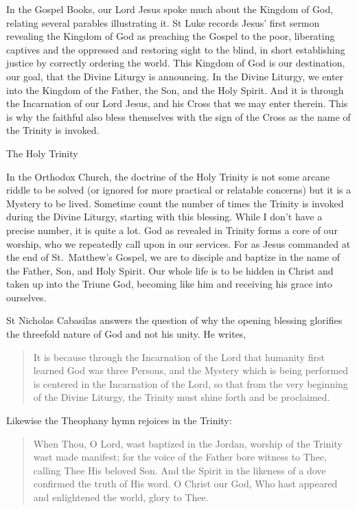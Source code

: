 \documentclass[
]{article}
\begin{document}
In the Gospel Books, our Lord Jesus spoke much about the Kingdom of God,
relating several parables illustrating it. St Luke records Jesus' first
sermon revealing the Kingdom of God as preaching the Gospel to the poor,
liberating captives and the oppressed and restoring sight to the blind,
in short establishing justice by correctly ordering the world. This
Kingdom of God is our destination, our goal, that the Divine Liturgy is
announcing. In the Divine Liturgy, we enter into the Kingdom of the
Father, the Son, and the Holy Spirit. And it is through the Incarnation
of our Lord Jesus, and his Cross that we may enter therein. This is why
the faithful also bless themselves with the sign of the Cross as the
name of the Trinity is invoked.

The Holy Trinity

In the Orthodox Church, the doctrine of the Holy Trinity is not some
arcane riddle to be solved (or ignored for more practical or relatable
concerns) but it is a Mystery to be lived. Sometime count the number of
times the Trinity is invoked during the Divine Liturgy, starting with
this blessing. While I don't have a precise number, it is quite a lot.
God as revealed in Trinity forms a core of our worship, who we
repeatedly call upon in our services. For as Jesus commanded at the end
of St.~Matthew's Gospel, we are to disciple and baptize in the name of
the Father, Son, and Holy Spirit. Our whole life is to be hidden in
Christ and taken up into the Triune God, becoming like him and receiving
his grace into ourselves.

St Nicholas Cabasilas answers the question of why the opening blessing
glorifies the threefold nature of God and not his unity. He writes,

\begin{quote}
It is because through the Incarnation of the Lord that humanity first
learned God was three Persons, and the Mystery which is being performed
is centered in the Incarnation of the Lord, so that from the very
beginning of the Divine Liturgy, the Trinity must shine forth and be
proclaimed.
\end{quote}

Likewise the Theophany hymn rejoices in the Trinity:

\begin{quote}
When Thou, O Lord, wast baptized in the Jordan, worship of the Trinity
wast made manifest; for the voice of the Father bore witness to Thee,
calling Thee His beloved Son. And the Spirit in the likeness of a dove
confirmed the truth of His word. O Christ our God, Who hast appeared and
enlightened the world, glory to Thee.
\end{quote}
\end{document}
